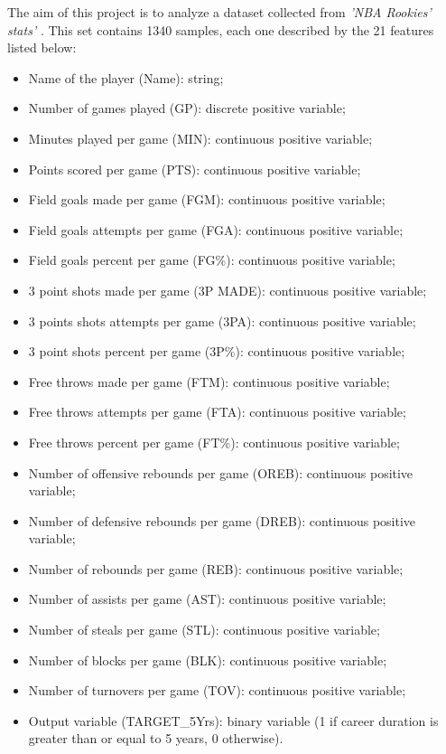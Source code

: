 The aim of this project is to analyze a dataset collected from \textit{'NBA Rookies' stats'} \cite{NBARS:2016}. This set contains 1340 samples, each one described by the 21 features listed below: 
\begin{itemize}
	\item Name of the player (Name): string;
	\item Number of games played (GP): discrete positive variable;
	\item Minutes played per game (MIN): continuous positive variable;
	\item Points scored per game (PTS): continuous positive variable;
	\item Field goals made per game (FGM): continuous positive variable;
	\item Field goals attempts per game (FGA): continuous positive  variable;
	\item Field goals percent per game (FG\%): continuous positive variable;
	\item 3 point shots made per game (3P MADE): continuous positive variable;
	\item 3 points shots attempts per game (3PA): continuous positive variable;
	\item 3 point shots percent per game (3P\%): continuous positive variable;
	\item Free throws made per game (FTM): continuous positive variable;
	\item Free throws attempts per game (FTA): continuous positive variable;
	\item Free throws percent per game (FT\%): continuous positive variable;
	\item Number of offensive rebounds per game (OREB): continuous positive variable;
	\item Number of defensive rebounds per game (DREB): continuous positive variable;
	\item Number of rebounds per game (REB): continuous positive variable;
	\item Number of assists per game (AST): continuous positive variable;
	\item Number of steals per game (STL): continuous positive variable;
	\item Number of blocks per game (BLK): continuous positive variable;
	\item Number of turnovers per game (TOV): continuous positive variable;
	\item Output variable (TARGET\_5Yrs): binary variable (1 if career duration is greater than or equal to 5 years, 0 otherwise).\\
\end{itemize} 

